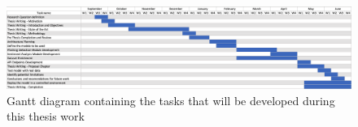 \begin{figure}[H]
    \begin{center}
        \includegraphics[width=12cm, angle=90]{figs/gantt_chart.png}
        \caption{Gantt diagram containing the tasks that will be developed during this thesis work}
        \label{fig:c3:gantt_chart}
    \end{center}
  \end{figure}